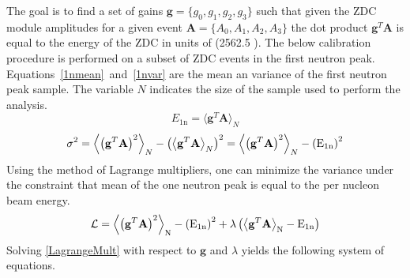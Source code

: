 The goal is to find a set of gains $\mathbf{g} = \{g_0,g_1,g_2,g_3\}$ such that given the ZDC module amplitudes for a given event $\mathbf{A} = \{A_0,A_1,A_2,A_3\}$ the dot product $\mathbf{g}^T\mathbf{A}$ is equal to the energy of the ZDC in units of \GeV (2562.5 \GeV).  The below calibration procedure is performed on a subset of ZDC events in the first neutron peak.  Equations~\ref{1nmean}~and~\ref{1nvar} are the mean an variance of the first neutron peak sample. The variable $N$ indicates the size of the sample used to perform the analysis.
\begin{equation}
    \label{1nmean}
    E_{\text{1n}} = \bigl \langle \mathbf{g}^T\mathbf{A} \bigr \rangle_{N}
\end{equation}
\begin{equation}
    \label{1nvar}
    \sigma^2 = \Bigl \langle \left( \mathbf{g}^T\mathbf{A} \right)^2  \Bigr \rangle_{N} - \left( \bigl \langle  \mathbf{g}^T\mathbf{A}  \bigr \rangle_{N} \right)^2 = \Bigl \langle \left( \mathbf{g}^T\mathbf{A} \right)^2  \Bigr \rangle_{N} - \left( \text{E}_{\text{1n}} \right)^2
\end{equation}
Using the method of Lagrange multipliers, one can minimize the variance under the constraint that mean of the one neutron peak is equal to the per nucleon beam energy.
\begin{equation}
    \label{LagrangeMult}
    \mathcal{L} = \Bigl \langle \left( \mathbf{g}^T\mathbf{A} \right)^2  \Bigr \rangle_{\text{N}} - \left( \text{E}_{\text{1n}} \right)^2 + \lambda\left( \bigl \langle \mathbf{g}^T\mathbf{A} \bigr \rangle_{\text{N}} -  \text{E}_{\text{1n}}\right)
\end{equation}
Solving \ref{LagrangeMult} with respect to $\mathbf{g}$ and $\lambda$ yields the following system of equations.
